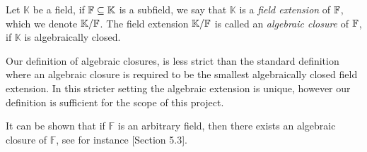 %

\begin{definition}
  Let $\mathbb{K}$ be a field, if $\mathbb{F} \subseteq \mathbb{K}$ is a subfield, we say that $\mathbb{K}$ is a \textit{field extension} of $\mathbb{F}$, which we denote $\mathbb{K} / \mathbb{F}$. The field extension $\mathbb{K}/\mathbb{F}$ is called an \textit{algebraic closure} of $\mathbb{F}$, if $\mathbb{K}$ is algebraically closed.
\end{definition}
\begin{remark}
  Our definition of algebraic closures, is less strict than the standard definition where an algebraic closure is required to be the smallest algebraically closed field extension. In this stricter setting the algebraic extension is unique, however our definition is sufficient for the scope of this project.
\end{remark}
\begin{remark}\label{rem:existence_of_alg_closure}
  It can be shown that if $\mathbb{F}$ is an arbitrary field, then there exists an algebraic closure of $\mathbb{F}$, see for instance \cite{Galois_theory}[Section 5.3].
\end{remark}

